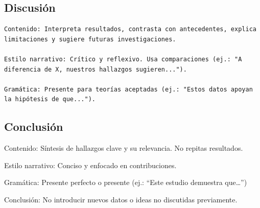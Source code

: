 \documentclass[
  10pt]{article}
\begin{document}
\subsection{Discusión}\label{discusiuxf3n}

\begin{tcolorbox}[enhanced jigsaw, colframe=quarto-callout-tip-color-frame, toprule=.15mm, opacitybacktitle=0.6, arc=.35mm, coltitle=black, title=\textcolor{quarto-callout-tip-color}{\faLightbulb}\hspace{0.5em}{Tip}, breakable, rightrule=.15mm, bottomtitle=1mm, titlerule=0mm, leftrule=.75mm, opacityback=0, colbacktitle=quarto-callout-tip-color!10!white, colback=white, left=2mm, bottomrule=.15mm, toptitle=1mm]

\begin{verbatim}
Contenido: Interpreta resultados, contrasta con antecedentes, explica limitaciones y sugiere futuras investigaciones.

Estilo narrativo: Crítico y reflexivo. Usa comparaciones (ej.: "A diferencia de X, nuestros hallazgos sugieren...").

Gramática: Presente para teorías aceptadas (ej.: "Estos datos apoyan la hipótesis de que...").
\end{verbatim}

\end{tcolorbox}

\subsection{Conclusión}\label{conclusiuxf3n}

\begin{tcolorbox}[enhanced jigsaw, colframe=quarto-callout-tip-color-frame, toprule=.15mm, opacitybacktitle=0.6, arc=.35mm, coltitle=black, title=\textcolor{quarto-callout-tip-color}{\faLightbulb}\hspace{0.5em}{Tip}, breakable, rightrule=.15mm, bottomtitle=1mm, titlerule=0mm, leftrule=.75mm, opacityback=0, colbacktitle=quarto-callout-tip-color!10!white, colback=white, left=2mm, bottomrule=.15mm, toptitle=1mm]

Contenido: Síntesis de hallazgos clave y su relevancia. No repitas
resultados.

Estilo narrativo: Conciso y enfocado en contribuciones.

Gramática: Presente perfecto o presente (ej.: ``Este estudio demuestra
que\ldots{}'')

Conclusión: No introducir nuevos datos o ideas no discutidas
previamente.

\end{tcolorbox}
\end{document}
